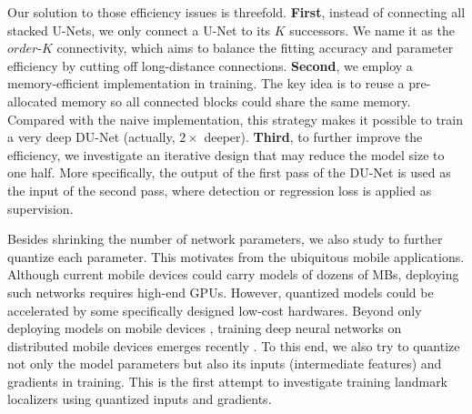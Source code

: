% 
Our solution to those efficiency issues is threefold. {\bf First}, instead of connecting all stacked U-Nets, we only connect a U-Net to its $K$ successors. We name it as the $order$-$K$ connectivity, which aims to balance the fitting accuracy and parameter efficiency by cutting off long-distance connections. {\bf Second}, we employ a memory-efficient implementation in training. The key idea is to reuse a pre-allocated memory so all connected blocks could share the same memory. Compared with the naive implementation, this strategy makes it possible to train a very deep DU-Net (actually, $2\times$ deeper). {\bf Third}, to further improve the efficiency, we investigate an iterative design that may reduce the model size to one half. More specifically, the output of the first pass of the DU-Net is used as the input of the second pass, where detection or regression loss is applied as supervision. 

Besides shrinking the number of network parameters, we also study to further quantize each parameter. This motivates from the ubiquitous mobile applications. Although current mobile devices could carry models of dozens of MBs, deploying such networks requires high-end GPUs. However, quantized models could be accelerated by some specifically designed low-cost hardwares. Beyond only deploying models on mobile devices \cite{li2017deeprebirth}, training deep neural networks on distributed mobile devices emerges recently \cite{mcmahan2016communication}. To this end, we also try to quantize not only the model parameters but also its inputs (intermediate features) and gradients in training. This is the first attempt to investigate training landmark localizers using quantized inputs and gradients.


